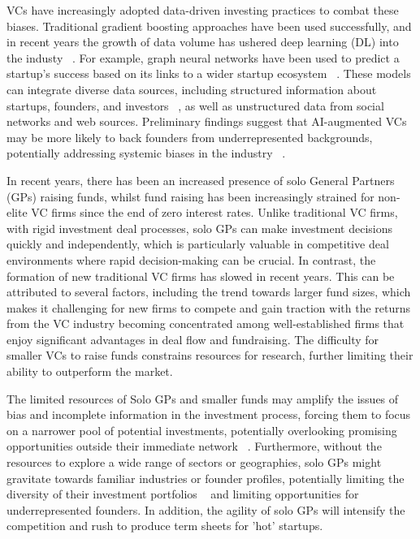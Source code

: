 \documentclass[a4paper, oneside]{discothesis}
\begin{document}
VCs have increasingly adopted data-driven investing practices to combat these biases. 
Traditional gradient boosting approaches have been used successfully, and in recent years the growth of data volume has ushered deep learning (DL) into the industy ~\cite{eqt}.
For example, graph neural networks have been used to predict a startup's success based on its links to a wider startup ecosystem ~\cite{corea}. 
These models can integrate diverse data sources, including structured information about startups, founders, and investors ~\cite{corea}, as well as unstructured data from social networks and web sources. 
Preliminary findings suggest that AI-augmented VCs may be more likely to back founders from underrepresented backgrounds, potentially addressing systemic biases in the industry ~\cite{futureVC}.

In recent years, there has been an increased presence of solo General Partners (GPs)  raising funds, whilst fund raising has been increasingly strained for non-elite VC firms since the end of zero interest rates. Unlike traditional VC firms, with rigid investment deal processes, solo GPs can make investment decisions quickly and independently, which is particularly valuable in competitive deal environments where rapid decision-making can be crucial.
In contrast, the formation of new traditional VC firms has slowed in recent years. This can be attributed to several factors, including the trend towards larger fund sizes, which makes it challenging for new firms to compete and gain traction with the returns from the VC industry becoming concentrated among well-established firms that enjoy significant advantages in deal flow and fundraising. 
The difficulty for smaller VCs to raise funds constrains resources for research, further limiting their ability to outperform the market.

The limited resources of Solo GPs and smaller funds may amplify the issues of bias and incomplete information in the investment process, forcing them to focus on a narrower pool of potential investments, potentially overlooking promising opportunities outside their immediate network ~\cite{huang2023networks}. Furthermore, without the resources to explore a wide range of sectors or geographies, solo GPs might gravitate towards familiar industries or founder profiles, potentially limiting the diversity of their investment portfolios ~\cite{GOMPERS2020169} and limiting opportunities for underrepresented founders. In addition, the agility of solo GPs will intensify the competition and rush to produce term sheets for 'hot' startups. 
\end{document}
